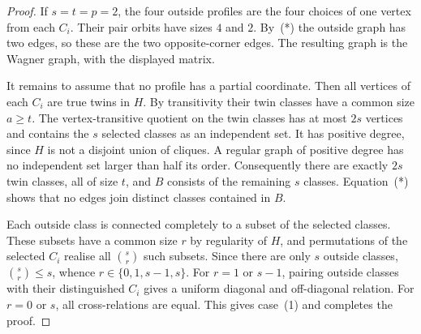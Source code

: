\begin{proof}
If $s=t=p=2$, the four outside profiles are the
four choices of one vertex from each $C_i$.
Their pair orbits have sizes $4$ and $2$.
By~(*) the outside graph has two edges, so these
are the two opposite-corner edges. The resulting
graph is the Wagner graph, with the displayed matrix.

It remains to assume that no profile has a partial
coordinate. Then all vertices of each $C_i$ are
true twins in $H$. By transitivity their twin
classes have a common size $a\ge t$.
The vertex-transitive quotient on the twin classes
has at most $2s$ vertices and contains the $s$
selected classes as an independent set.
It has positive degree, since $H$ is not a disjoint
union of cliques. A regular graph of positive degree
has no independent set larger than half its order.
Consequently there are exactly $2s$ twin classes,
all of size $t$, and $B$ consists of the remaining
$s$ classes. Equation~(*) shows that no edges join
distinct classes contained in $B$.

Each outside class is connected completely to a
subset of the selected classes. These subsets have
a common size $r$ by regularity of $H$, and
permutations of the selected $C_i$ realise all
$\binom sr$ such subsets. Since there are only
$s$ outside classes, $\binom sr\le s$, whence
$r\in\{0,1,s-1,s\}$. For $r=1$ or $s-1$, pairing
outside classes with their distinguished $C_i$
gives a uniform diagonal and off-diagonal relation.
For $r=0$ or $s$, all cross-relations are equal.
This gives case~(1) and completes the proof.
\end{proof}
